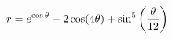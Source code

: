 \documentclass[preview]{standalone}
\begin{document}
\begin{align*}
\special{dvisvgm:raw <g id='unique000'>}r = e^{\cos\theta} - 2\cos(4\theta) + \sin^5\left(\frac{\theta}{12}\right)\special{dvisvgm:raw </g>}
\end{align*}
\end{document}
